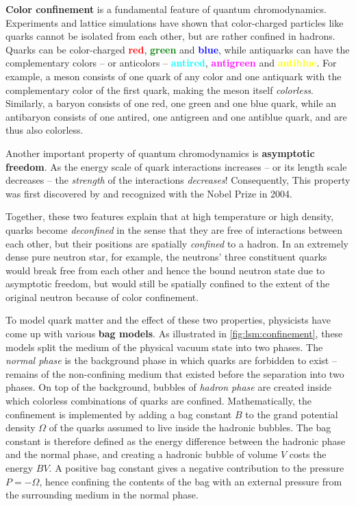 \textbf{Color confinement} is a fundamental feature of quantum chromodynamics.
Experiments and lattice simulations have shown that color-charged particles like quarks cannot be isolated from each other, but are rather confined in hadrons.
Quarks can be color-charged \textcolor{red}{\textbf{red}}, \textcolor{green}{\textbf{green}} and \textcolor{blue}{\textbf{blue}},
while antiquarks can have the complementary colors -- or anticolors -- \textcolor{cyan}{\textbf{antired}}, \textcolor{magenta}{\textbf{antigreen}} and \textcolor{yellow}{\textbf{antiblue}}.
For example, a meson consists of one quark of any color and one antiquark with the complementary color of the first quark, making the meson itself \emph{colorless}.
Similarly, a baryon consists of one red, one green and one blue quark,
while an antibaryon consists of one antired, one antigreen and one antiblue quark,
and are thus also colorless.

Another important property of quantum chromodynamics is \textbf{asymptotic freedom}.
As the energy scale of quark interactions increases -- or its length scale decreases -- the \emph{strength} of the interactions \emph{decreases}!
Consequently, 
This property was first discovered by \cite{ref:asymptotic_freedom_gross_wilczek,ref:asymptotic_freedom_politzer} and recognized with the Nobel Prize in 2004.

Together, these two features explain that at high temperature or high density,
quarks become \emph{deconfined} in the sense that they are free of interactions between each other,
but their positions are spatially \emph{confined} to a hadron.
In an extremely dense pure neutron star, for example,
the neutrons' three constituent quarks would break free from each other and hence the bound neutron state due to asymptotic freedom,
but would still be spatially confined to the extent of the original neutron because of color confinement.

To model quark matter and the effect of these two properties,
physicists have come up with various \textbf{bag models}.
As illustrated in \cref{fig:lsm:confinement}, these models split the medium of the physical vacuum state into two phases.
The \emph{normal phase} is the background phase in which quarks are forbidden to exist -- remains of the non-confining medium that existed before the separation into two phases.
On top of the background, bubbles of \emph{hadron phase} are created inside which colorless combinations of quarks are confined.
Mathematically, the confinement is implemented by adding a bag constant $B$ to the grand potential density $\Omega$ of the quarks assumed to live inside the hadronic bubbles.
The bag constant is therefore defined as the energy difference between the hadronic phase and the normal phase,
and creating a hadronic bubble of volume $V$ costs the energy $B V$.
A positive bag constant gives a negative contribution to the pressure $P = -\Omega$,
hence confining the contents of the bag with an external pressure from the surrounding medium in the normal phase.

